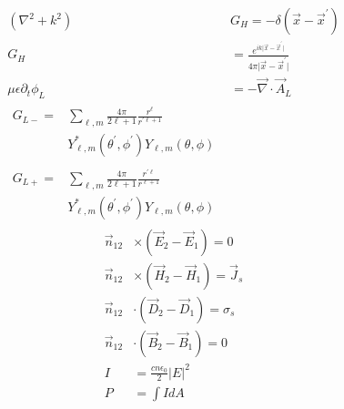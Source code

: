 \documentclass[12pt]{article}
\begin{document}
\begin{multicols}{3}
\begin{align}
  (\nabla^2 + k^2) &G_{H} =
  -\delta(\vec{x} - \vec{x}^{\prime})\\
  G_H &= \frac{e^{ik\lvert \vec{x}
      - \vec{x}^{\prime} \rvert}}{4\pi \lvert \vec{x} - \vec{x}^{\prime} \rvert}\\
  \mu \epsilon \partial_t \phi_L &= -\vec{\nabla} \cdot \vec{A}_L\\
  \begin{split}
    G_{L-} = &\textstyle{\sum\limits_{\ell, m}} {}\frac{4\pi}{2\ell + 1} \frac{r^{\ell}}{r^{\prime \ell + 1}}\\
    &Y^{*}_{\ell, m}(\theta^{\prime}, \phi^{\prime})
  Y_{\ell, m}(\theta, \phi)
  \end{split}\\
  \begin{split}
  G_{L+} = &{}\textstyle{\sum\limits_{\ell, m}}
  \frac{4\pi}{2\ell + 1} \frac{r^{\prime \ell}}{r^{\ell + 1}}\\
  &Y^{*}_{\ell, m}(\theta^{\prime}, \phi^{\prime})
  Y_{\ell, m}(\theta, \phi)
  \end{split}
\end{align}
\begin{align}
  \vec{n}_{12} &\times (\vec{E}_2 - \vec{E}_1) = 0\\
  \vec{n}_{12} &\times (\vec{H}_2 - \vec{H}_1) = \vec{J}_s\\
  \vec{n}_{12} &\cdot (\vec{D}_2 - \vec{D}_1) = \sigma_s\\
  \vec{n}_{12} &\cdot (\vec{B}_2 - \vec{B}_1) = 0\\
  I &= \frac{c n \epsilon_0}{2} \lvert E \rvert^2\\
  P &= \int I dA
\end{align}


\end{multicols}
\end{document}
